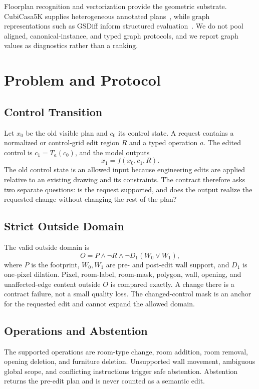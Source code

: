 \documentclass[10pt,twocolumn,letterpaper]{article}
\begin{document}
Floorplan recognition and vectorization provide the geometric substrate.
CubiCasa5K supplies heterogeneous annotated plans~\cite{cubicasa}, while graph
representations such as GSDiff inform structured evaluation~\cite{gsdiff}. We do
not pool aligned, canonical-instance, and typed graph protocols, and we report
graph values as diagnostics rather than a ranking.

\section{Problem and Protocol}
\subsection{Control Transition}
Let $x_0$ be the old visible plan and $c_0$ its control state. A request contains
a normalized or control-grid edit region $R$ and a typed operation $a$. The
edited control is $c_1=T_a(c_0)$, and the model outputs
\begin{equation}
x_1=f(x_0,c_1,R).
\end{equation}
The old control state is an allowed input because engineering edits are applied
relative to an existing drawing and its constraints. The contract therefore asks
two separate questions: is the request supported, and does the output realize the
requested change without changing the rest of the plan?

\subsection{Strict Outside Domain}
The valid outside domain is
\begin{equation}
O = P \land \neg R \land \neg D_1(W_0 \lor W_1),
\end{equation}
where $P$ is the footprint, $W_0,W_1$ are pre- and post-edit wall support, and
$D_1$ is one-pixel dilation. Pixel, room-label, room-mask, polygon, wall, opening,
and unaffected-edge content outside $O$ is compared exactly. A change there is a
contract failure, not a small quality loss. The changed-control mask is an anchor
for the requested edit and cannot expand the allowed domain.

\subsection{Operations and Abstention}
The supported operations are room-type change, room addition, room removal,
opening deletion, and furniture deletion. Unsupported wall movement, ambiguous
global scope, and conflicting instructions trigger safe abstention. Abstention
returns the pre-edit plan and is never counted as a semantic edit.
\end{document}
